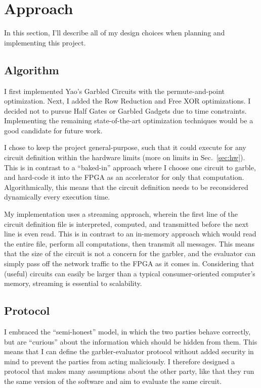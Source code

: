 \section{Approach}
In this section, I'll describe all of my design choices when planning and implementing this project.

\subsection{Algorithm}
I first implemented Yao's Garbled Circuits with the permute-and-point optimization. Next, I added the Row Reduction and Free XOR optimizations. I decided not to pursue Half Gates or Garbled Gadgets due to time constraints. Implementing the remaining state-of-the-art optimization techniques would be a good candidate for future work.

I chose to keep the project general-purpose, such that it could execute for any circuit definition within the hardware limits (more on limits in Sec.~\ref{sec:hw}). This is in contrast to a ``baked-in'' approach where I choose one circuit to garble, and hard-code it into the FPGA as an accelerator for only that computation. Algorithmically, this means that the circuit definition needs to be reconsidered dynamically every execution time.

My implementation uses a streaming approach, wherein the first line of the circuit definition file is interpreted, computed, and transmitted before the next line is even read. This is in contrast to an in-memory approach which would read the entire file, perform all computations, then transmit all messages. This means that the size of the circuit is not a concern for the garbler, and the evaluator can simply pass off the network traffic to the FPGA as it comes in. Considering that (useful) circuits can easily be larger than a typical consumer-oriented computer's memory, streaming is essential to scalability.

\subsection{Protocol}
I embraced the ``semi-honest'' model, in which the two parties behave correctly, but are ``curious'' about the information which should be hidden from them. This means that I can define the garbler-evaluator protocol without added security in mind to prevent the parties from acting maliciously. I therefore designed a protocol that makes many assumptions about the other party, like that they run the same version of the software and aim to evaluate the same circuit.

